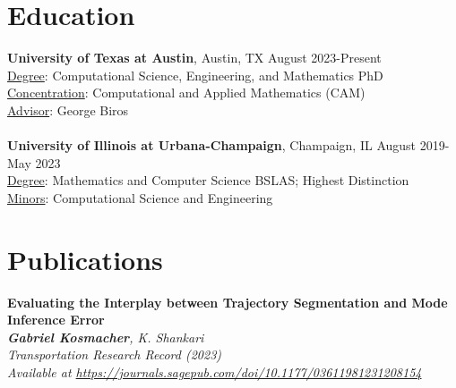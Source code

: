 \documentclass[resmargin, 10pt]{res} %
\begin{document}
\begin{resume}


\vspace{-20pt}

\section{Education}

{\bf University of Texas at Austin}, Austin, TX \hfill August 2023-Present \\
\underline{Degree}: Computational Science, Engineering, and Mathematics PhD \\ %
\underline{Concentration}: Computational and Applied Mathematics (CAM)\\
\underline{Advisor}: George Biros \\ \\
{\bf University of Illinois at Urbana-Champaign}, Champaign, IL \hfill August 2019-May 2023 \\
\underline{Degree}: Mathematics and Computer Science BSLAS; Highest Distinction \\ %
\underline{Minors}: Computational Science and Engineering \\

\vspace{-8pt}
\section{Publications}

\textbf{Evaluating the Interplay between Trajectory Segmentation and Mode Inference Error} \\
\sl{\textbf{Gabriel Kosmacher}, K. Shankari}
\\ Transportation Research Record (2023)
 \\ Available at \href{https://journals.sagepub.com/doi/10.1177/03611981231208154}{https://journals.sagepub.com/doi/10.1177/03611981231208154}


\end{resume}
\end{document}

